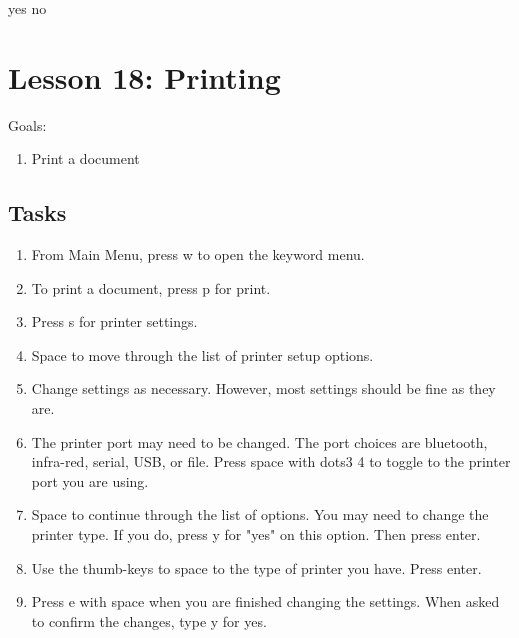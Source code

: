 \documentclass[10pt,letterpaper,twoside]{report}
\begin{document}
{{{{yes  no







\section*{Lesson 18: Printing}


Goals:



\begin{enumerate}
	\item Print a document
\end{enumerate}



 \subsection{Tasks}



\begin{enumerate}
	\item From Main Menu, press w to open the keyword menu.
	      
	\item To print a document, press p for print.
	      
	\item Press s for printer settings.
	      
	\item Space to move through the list of printer setup options.
	      
	\item Change settings as necessary.  However, most settings should be fine as they are.
	      
	\item The printer port may need to be changed.  The port choices are bluetooth, infra-red, serial, USB, or file.  Press space with dots3 4 to toggle to the printer port you are using.
	      
	\item Space to continue through the list of options.  You may need to change the printer type. If you do, press y for "yes" on this option.  Then press enter.
	      
	\item Use the thumb-keys to space to the type of printer you have.  Press enter.
	      
	\item Press e with space when you are finished changing the settings.  When asked to confirm the changes, type y for yes.
	      

\end{enumerate}}}}}
\end{document}
